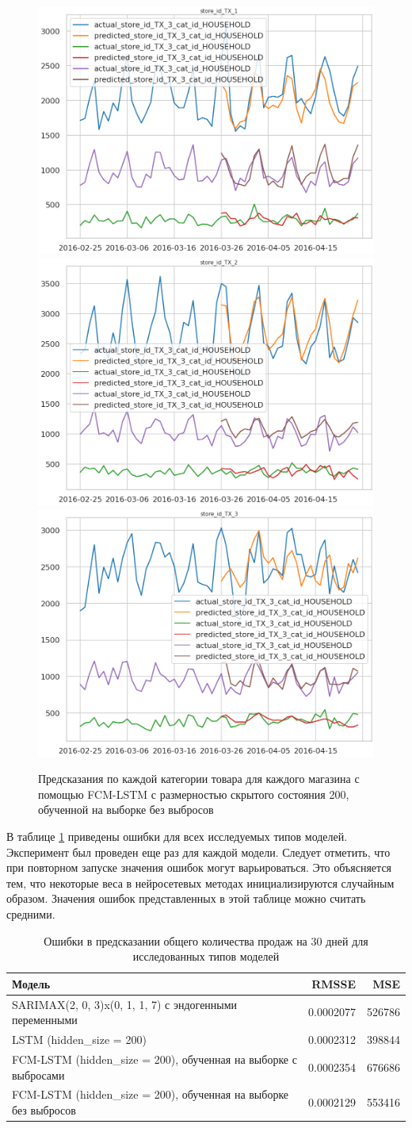 \def\figurename{Рис}
\begin{figure}[t]
	\centering
	\includegraphics[width=0.25\columnwidth]{./img/fcm_lstm_tx1_110_days.png}
	\includegraphics[width=0.25\columnwidth]{./img/fcm_lstm_tx2_110_days.png}
	\includegraphics[width=0.25\columnwidth]{./img/fcm_lstm_tx3_110_days.png}
	\caption{Предсказания по каждой категории товара для каждого магазина с помощью FCM-LSTM с размерностью скрытого состояния 200, обученной на выборке без выбросов}
	\label{img:prediction_fcm_lstm_110d}
\end{figure}


В таблице \ref{tbl:all_models_comparation} приведены ошибки для всех исследуемых типов моделей.
Эксперимент был проведен еще раз для каждой модели. Следует отметить, что при повторном
запуске значения ошибок могут варьироваться. Это объясняется тем, что некоторые веса
в нейросетевых методах инициализируются случайным образом. Значения ошибок представленных
в этой таблице можно считать средними.

\begin{table}
    \caption{ Ошибки в предсказании общего количества продаж на 30 дней для исследованных типов моделей }
    \centering
    \begin{tabular}{|l|r||r|}
        \hline
            Модель                                                            & RMSSE     & MSE    \\
        \hline
            SARIMAX(2, 0, 3)x(0, 1, 1, 7) с эндогенными переменными           & 0.0002077 & 526786 \\
            LSTM (hidden\_size = 200)                                         & 0.0002312 & 398844 \\
            FCM-LSTM (hidden\_size = 200), обученная на выборке с выбросами   & 0.0002354 & 676686 \\
            FCM-LSTM (hidden\_size = 200), обученная на выборке без выбросов  & 0.0002129 & 553416 \\
        \hline
    \end{tabular}
    \label{tbl:all_models_comparation}
\end{table}

